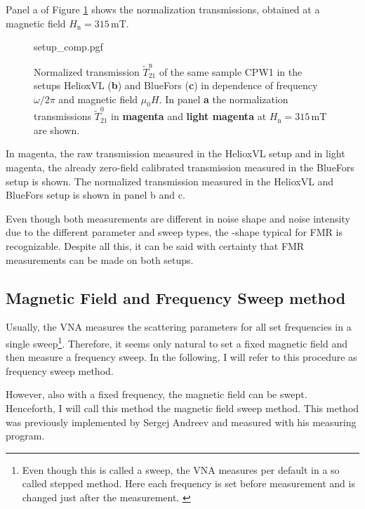 Panel a of Figure \ref{fig:analysis_setup_comp} shows the normalization transmissions, obtained at a magnetic field $H_\text{n}=315\,$mT.
\begin{figure}
    \centering
    {setup_comp.pgf}
    \caption[Normalized transmission of sample CPW1 at the setups HelioxVL and BlueFors]{Normalized transmission $\widetilde{T}_{21}^\text{n}$ of the same sample CPW1 in the setups HelioxVL (\textbf{\color{antiseeblau100}b}) and BlueFors (\textbf{\color{antiseeblau100}c}) in dependence of frequency $\omega/2\pi$ and magnetic field $\mu_0H$. In panel \textbf{\color{antiseeblau100}a} the normalization transmissions $\widetilde{T}_{21}^0$ in \textbf{\color{antiseeblau100}magenta} and \textbf{\color[rgb]{0.878733401483036, 0.49928686449731624, 0.7675654756534815}light magenta} at $H_\text{n}=315\,$mT are shown.}
    \label{fig:analysis_setup_comp}
\end{figure}
In magenta, the raw transmission measured in the HelioxVL setup and in light magenta, the already zero-field calibrated transmission measured in the BlueFors setup is shown. The normalized transmission measured in the HelioxVL and BlueFors setup is shown in panel b and c. 

Even though both measurements are different in noise shape and noise intensity due to the different parameter and sweep types, the -shape typical for FMR is recognizable. Despite all this, it can be said with certainty that FMR measurements can be made on both setups.

\subsection{Magnetic Field and Frequency Sweep method} \label{sec:hf_sweep}
Usually, the VNA measures the scattering parameters for all set frequencies in a single sweep\footnote{Even though this is called a sweep, the VNA measures per default in a so called stepped method. Here each frequency is set before measurement and is changed just after the measurement. \cite{ZNB40manual}}. Therefore, it seems only natural to set a fixed magnetic field and then measure a frequency sweep. In the following, I will refer to this procedure as frequency sweep method.

However, also with a fixed frequency, the magnetic field can be swept. Henceforth, I will call this method the magnetic field sweep method. This method was previously implemented by Sergej Andreev and measured with his measuring program.

